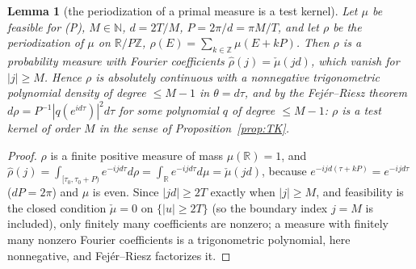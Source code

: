 \documentclass[11pt]{amsart}
\newtheorem{lemma}[theorem]{Lemma}
\theoremstyle{definition}
\theoremstyle{remark}
\newcommand{\R}{\mathbb R}
\newcommand{\N}{\mathbb N}
\newcommand{\Z}{\mathbb Z}
\begin{document}
\begin{lemma}[the periodization of a primal measure is a test kernel]\label{lem:R1}
Let $\mu$ be feasible for \textup{(P)}, $M\in\N$, $d=2T/M$, $P=2\pi/d=\pi M/T$, and let $\rho$ be the
periodization of $\mu$ on $\R/P\Z$, $\rho(E)=\sum_{k\in\Z}\mu(E+kP)$. Then $\rho$ is a probability
measure with Fourier coefficients $\widehat\rho(j)=\check\mu(jd)$, which vanish for $|j|\ge M$. Hence
$\rho$ is absolutely continuous with a nonnegative trigonometric polynomial density of degree
$\le M-1$ in $\theta=d\tau$, and by the Fej\'er--Riesz theorem
$d\rho=P^{-1}|q(e^{id\tau})|^2d\tau$ for some polynomial $q$ of degree $\le M-1$: $\rho$ is a test
kernel of order $M$ in the sense of Proposition~\ref{prop:TK}.
\end{lemma}
\begin{proof}
$\rho$ is a finite positive measure of mass $\mu(\R)=1$, and
$\widehat\rho(j)=\int_{[\tau_0,\tau_0+P)}e^{-ijd\tau}d\rho=\int_\R e^{-ijd\tau}d\mu=\check\mu(jd)$,
because $e^{-ijd(\tau+kP)}=e^{-ijd\tau}$ ($dP=2\pi$) and $\mu$ is even. Since $|jd|\ge2T$ exactly when
$|j|\ge M$, and feasibility is the closed condition $\check\mu=0$ on $\{|u|\ge2T\}$ (so the boundary
index $j=M$ is included), only finitely many coefficients are nonzero; a measure with finitely many
nonzero Fourier coefficients is a trigonometric polynomial, here nonnegative, and Fej\'er--Riesz
factorizes it.
\end{proof}
\end{document}
